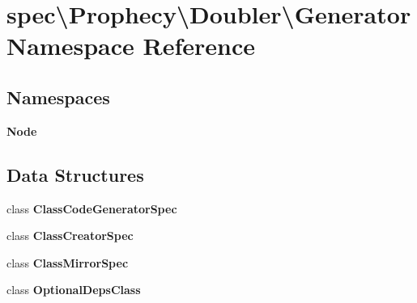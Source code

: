 \section{spec\textbackslash{}Prophecy\textbackslash{}Doubler\textbackslash{}Generator Namespace Reference}
\label{namespacespec_1_1_prophecy_1_1_doubler_1_1_generator}
\subsection*{Namespaces}
\begin{DoxyCompactItemize}
\item 
 {\bf Node}
\end{DoxyCompactItemize}
\subsection*{Data Structures}
\begin{DoxyCompactItemize}
\item 
class {\bf Class\+Code\+Generator\+Spec}
\item 
class {\bf Class\+Creator\+Spec}
\item 
class {\bf Class\+Mirror\+Spec}
\item 
class {\bf Optional\+Deps\+Class}
\end{DoxyCompactItemize}
